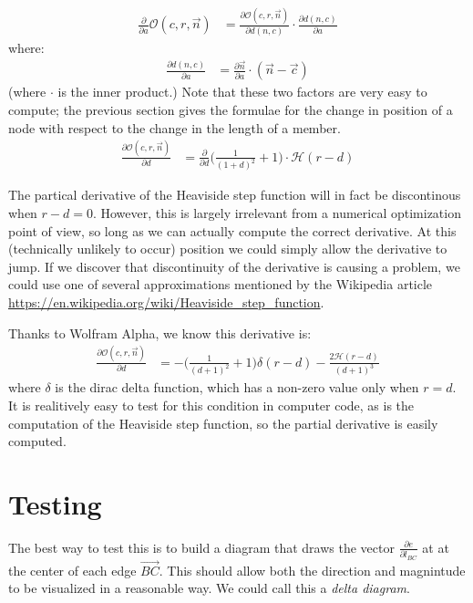 \documentclass[11pt]{article}
\begin{document}
\begin{align*}
  \frac{\partial}{\partial a}  \mathcal{O}(c,r,\overrightarrow{n}) &=
  \frac{\partial \mathcal{O}(c,r,\overrightarrow{n})}{\partial d(n,c)} \cdot \frac{\partial d(n,c)}{\partial a}
\end{align*}
where:
\begin{align*}
  \frac{\partial d(n,c)}{\partial a} &=  \frac{\partial \overrightarrow{n}}{\partial a} \cdot ({\overrightarrow{n} - \overrightarrow{c}})
\end{align*}
(where $\cdot$ is the inner product.) Note that these two factors are very easy to compute; the previous section gives the formulae
for the change in position of a node with respect to the change in the length of a member.
\begin{align*}  
    \frac{\partial \mathcal{O}(c,r,\overrightarrow{n})}{\partial d}  &= \frac{\partial}{\partial d} \big( \frac{1}{(1 + d)^2} + 1\big) \cdot \mathcal{H}(r-d)
\end{align*}

The partical derivative of the Heaviside step function will in fact be discontinous when $r-d = 0$. However,
this is largely irrelevant from a numerical optimization point of view, so long as we can actually compute the
correct derivative. At this (technically unlikely to occur) position we could simply allow the derivative to jump.
If we discover that discontinuity of the derivative is causing a problem, we could use one of several approximations
mentioned by the Wikipedia article \url{https://en.wikipedia.org/wiki/Heaviside_step_function}.

Thanks to Wolfram Alpha, we know this derivative is:
\begin{align*}  
  \frac{\partial \mathcal{O}(c,r,\overrightarrow{n})}{\partial d}  &=
  -\big(\frac{1}{(d+1)^2}+1\big)\delta(r-d) - \frac{2\mathcal{H}(r-d)}{(d+1)^3}
\end{align*}
where $\delta$ is the dirac delta function, which has a non-zero value only when $r = d$.
It is realitively easy to test for this condition in computer code, as is the computation
of the Heaviside step function, so the partial derivative
is easily computed.


\section{Testing}

The best way to test this is to build a diagram that draws the vector $\frac{\partial e}{\partial l_{BC}}$ at at the center
of each edge $\vec{BC}$. This should allow both the direction and magnintude to be visualized in a reasonable way.
We could call this a {\em delta diagram}.
\end{document}
